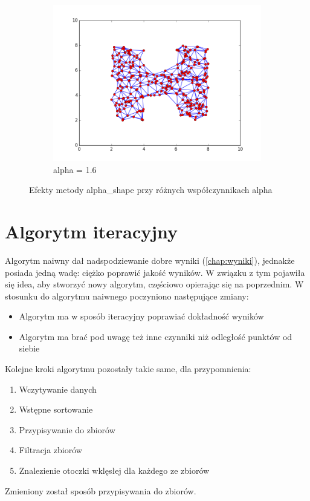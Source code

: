 \begin{figure}[h!]
\begin{subfigure}[b]{0.33\textwidth}
		\includegraphics[width=\linewidth]{img/triangulacja3.png}
		\caption {alpha = 1.6}
	\end{subfigure}
    \caption{Efekty metody alpha\_shape przy różnych współczynnikach alpha}
    \label{fig:triangulacja_alpha}
\end{figure}

\section{Algorytm iteracyjny}

Algorytm naiwny dał nadspodziewanie dobre wyniki (\autoref{chap:wyniki}), jednakże posiada jedną wadę:
ciężko poprawić jakość wyników. W związku z tym pojawiła się idea, aby stworzyć nowy algorytm, częściowo
opierając się na poprzednim. W stosunku do algorytmu naiwnego poczyniono następujące zmiany:
\begin{itemize}
    \item Algorytm ma w sposób iteracyjny poprawiać dokładność wyników
    \item Algorytm ma brać pod uwagę też inne czynniki niż odległość punktów od siebie
\end{itemize}

\noindent Kolejne kroki algorytmu pozostały takie same, dla przypomnienia:
\begin{enumerate}
    \item Wczytywanie danych
    \item Wstępne sortowanie
    \item Przypisywanie do zbiorów
    \item Filtracja zbiorów
    \item Znalezienie otoczki wklęsłej dla każdego ze zbiorów
\end{enumerate}

Zmieniony został sposób przypisywania do zbiorów. 
